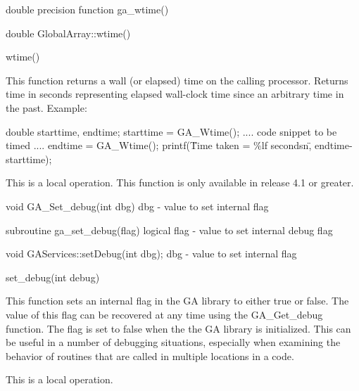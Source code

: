 \documentclass[12pt]{article}
\begin{document}
\begin{fapi}
double precision function ga_wtime()
\end{fapi}

\begin{cxxapi}
double GlobalArray::wtime()
\end{cxxapi}

\begin{pyapi}
wtime() 
\end{pyapi} 


\begin{desc}

This function returns a wall (or elapsed) time on the calling processor. Returns time in seconds representing elapsed wall-clock time since an arbitrary time in the past. Example:

\begin{codeseg}
double starttime, endtime;
starttime = GA_Wtime();
.... code snippet to be timed ....
endtime   = GA_Wtime();
printf(\"Time taken = \%lf secondsn\", endtime-starttime);
\end{codeseg}

This is a local operation.
This function is only available in release 4.1 or greater.
\end{desc}


\begin{capi}
void GA_Set_debug(int dbg)
   dbg          - value to set internal flag                                \access{[input]} 
\end{capi}

\begin{fapi}
subroutine ga_set_debug(flag)
   logical flag - value to set internal debug flag                          \access{[input]} 
\end{fapi}

\begin{cxxapi}
void GAServices::setDebug(int dbg);
   dbg          - value to set internal flag                                \access{[input]} 
\end{cxxapi}

\begin{pyapi}
set_debug(int debug)  
\end{pyapi} 


\begin{desc}

This function sets an internal flag in the GA library to either true or false. The value of this flag can be recovered at any time using the GA_Get_debug function. The flag is set to false when the the GA library is initialized. This can be useful in a number of debugging situations, especially when examining the behavior of routines that are called in multiple locations in a code.

This is a local operation.
\end{desc}
\end{document}
